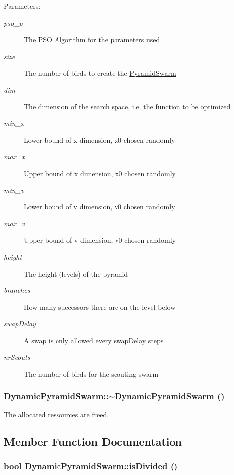 \begin{Desc}
\item[Parameters: ]\par
\begin{description}
\item[{\em 
pso\_\-p}]The \hyperlink{classPSO}{PSO} Algorithm for the parameters used \item[{\em 
size}]The number of birds to create the \hyperlink{classPyramidSwarm}{PyramidSwarm} \item[{\em 
dim}]The dimension of the search space, i.e. the function to be optimized \item[{\em 
min\_\-x}]Lower bound of x dimension, x0 chosen randomly \item[{\em 
max\_\-x}]Upper bound of x dimension, x0 chosen randomly \item[{\em 
min\_\-v}]Lower bound of v dimension, v0 chosen randomly \item[{\em 
max\_\-v}]Upper bound of v dimension, v0 chosen randomly \item[{\em 
height}]The height (levels) of the pyramid \item[{\em 
branches}]How many successors there are on the level below \item[{\em 
swapDelay}]A swap is only allowed every swapDelay steps \item[{\em 
nrScouts}]The number of birds for the scouting swarm \end{description}
\end{Desc}
\hypertarget{classDynamicPyramidSwarm_d8b5d895a18016eccfdac566d9281bc6}{
\subsubsection{\setlength{\rightskip}{0pt plus 5cm}DynamicPyramidSwarm::$\sim$DynamicPyramidSwarm ()}}
\label{classDynamicPyramidSwarm_d8b5d895a18016eccfdac566d9281bc6}


The allocated ressources are freed. 



\subsection{Member Function Documentation}
\hypertarget{classDynamicPyramidSwarm_65efd123a0e770211a47fd384c36af12}{
\subsubsection{\setlength{\rightskip}{0pt plus 5cm}bool DynamicPyramidSwarm::isDivided ()}}
\label{classDynamicPyramidSwarm_65efd123a0e770211a47fd384c36af12}


